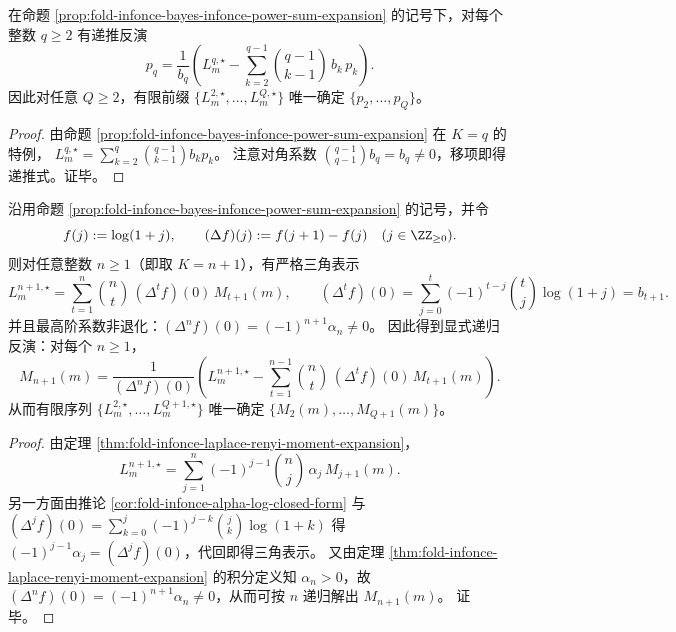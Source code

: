 \begin{corollary}[损失塔对幂和的三角反演]\label{cor:fold-infonce-loss-tower-triangular-inversion-power-sums}
在命题 \ref{prop:fold-infonce-bayes-infonce-power-sum-expansion} 的记号下，对每个整数 \(q\ge 2\) 有递推反演
\[
p_q
=\frac{1}{b_q}\left(
L_m^{q,\star}-\sum_{k=2}^{q-1}\binom{q-1}{k-1}\,b_k\,p_k
\right).
\]
因此对任意 \(Q\ge 2\)，有限前缀 \(\{L_m^{2,\star},\dots,L_m^{Q,\star}\}\) 唯一确定 \(\{p_2,\dots,p_Q\}\)。
\end{corollary}
\begin{proof}
由命题 \ref{prop:fold-infonce-bayes-infonce-power-sum-expansion} 在 \(K=q\) 的特例，
\(
L_m^{q,\star}=\sum_{k=2}^{q}\binom{q-1}{k-1}b_k p_k
\)。
注意对角系数 \(\binom{q-1}{q-1}b_q=b_q\neq 0\)，移项即得递推式。证毕。
\end{proof}


\begin{corollary}\label{cor:fold-infonce-triangular-inversion-collision-spectrum}
沿用命题 \ref{prop:fold-infonce-bayes-infonce-power-sum-expansion} 的记号，并令
\[
f(j):=\log(1+j),\qquad (\Delta f)(j):=f(j+1)-f(j)
\quad(j\in\ZZ_{\ge 0}).
\]
则对任意整数 \(n\ge 1\)（即取 \(K=n+1\)），有严格三角表示
\[
L_m^{n+1,\star}
=\sum_{t=1}^{n}\binom{n}{t}\,(\Delta^t f)(0)\,M_{t+1}(m),
\qquad
(\Delta^t f)(0)=\sum_{j=0}^{t}(-1)^{t-j}\binom{t}{j}\log(1+j)=b_{t+1}.
\]
并且最高阶系数非退化：\((\Delta^{n}f)(0)=(-1)^{n+1}\alpha_n\neq 0\)。
因此得到显式递归反演：对每个 \(n\ge 1\)，
\[
M_{n+1}(m)
=\frac{1}{(\Delta^{n}f)(0)}
\left(
L_m^{n+1,\star}-\sum_{t=1}^{n-1}\binom{n}{t}\,(\Delta^{t}f)(0)\,M_{t+1}(m)
\right).
\]
从而有限序列 \(\{L_m^{2,\star},\dots,L_m^{Q+1,\star}\}\) 唯一确定 \(\{M_2(m),\dots,M_{Q+1}(m)\}\)。
\end{corollary}
\begin{proof}
由定理 \ref{thm:fold-infonce-laplace-renyi-moment-expansion}，
\[
L_m^{n+1,\star}
=\sum_{j=1}^{n}(-1)^{j-1}\binom{n}{j}\,\alpha_j\,M_{j+1}(m).
\]
另一方面由推论 \ref{cor:fold-infonce-alpha-log-closed-form} 与 \((\Delta^j f)(0)=\sum_{k=0}^{j}(-1)^{j-k}\binom{j}{k}\log(1+k)\) 得
\(
(-1)^{j-1}\alpha_j=(\Delta^j f)(0)
\)，代回即得三角表示。
又由定理 \ref{thm:fold-infonce-laplace-renyi-moment-expansion} 的积分定义知 \(\alpha_n>0\)，故 \((\Delta^n f)(0)=(-1)^{n+1}\alpha_n\neq 0\)，从而可按 \(n\) 递归解出 \(M_{n+1}(m)\)。
证毕。
\end{proof}

